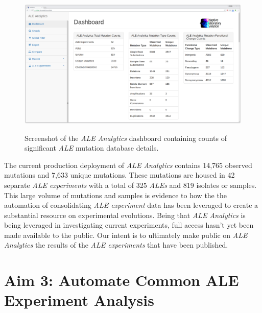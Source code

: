 \documentclass[12pt,final,masters,chapterheads]{ucsd}  %
\begin{document}
\begin{figure}[H]
  \caption{Screenshot of the \textit{ALE Analytics} dashboard containing counts of significant \textit{ALE} mutation database details.}
  \centering
  \includegraphics[width=1\textwidth]{dashboard_screenshot.png}
  \label{fig:dashboard_screenshot}
\end{figure}

The current production deployment of \textit{ALE Analytics} contains 14,765 observed mutations and 7,633 unique mutations. These mutations are housed in 42 separate \textit{ALE experiments} with a total of 325 \textit{ALEs} and 819 isolates or samples. This large volume of mutations and samples is evidence to how the the automation of consolidating \textit{ALE experiment} data has been leveraged to create a substantial resource on experimental evolutions. Being that \textit{ALE Analytics} is being leveraged in investigating current experiments, full access hasn't yet been made available to the public. Our intent is to ultimately make public on \textit{ALE Analytics} the results of the \textit{ALE experiments} that have been published.

% 
% 
\chapter{Aim 3: Automate Common ALE Experiment Analysis}
\end{document}
